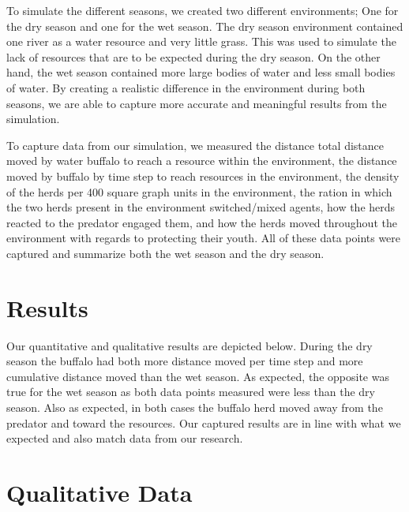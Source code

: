 \documentclass[12pt]{article}
\begin{document}
To simulate the different seasons, we created two different environments; One for the dry season and one for the wet season. The dry season environment contained one river as a water resource and very little grass. This was used to simulate the lack of resources that are to be expected during the dry season. On the other hand, the wet season contained more large bodies of water and less small bodies of water. By creating a realistic difference in the environment during both seasons, we are able to capture more accurate and meaningful results from the simulation. 

To capture data from our simulation, we measured the distance total distance moved by water buffalo to reach a resource within the environment, the distance moved by buffalo by time step to reach resources in the environment, the density of the herds per 400 square graph units in the environment, the ration in which the two herds present in the environment switched/mixed agents, how the herds reacted to the predator engaged them, and how the herds moved throughout the environment with regards to protecting their youth. All of these data points were captured and summarize both the wet season and the dry season.


\section*{Results}

Our quantitative and qualitative results are depicted below. During the dry season the buffalo had both more distance moved per time step and more cumulative distance moved than the wet season. As expected, the opposite was true for the wet season as both data points measured were less than the dry season. Also as expected, in both cases the buffalo herd moved away from the predator and toward the resources. Our captured results are in line with what we expected and also match data from our research. 

\section*{Qualitative Data}
\end{document}
